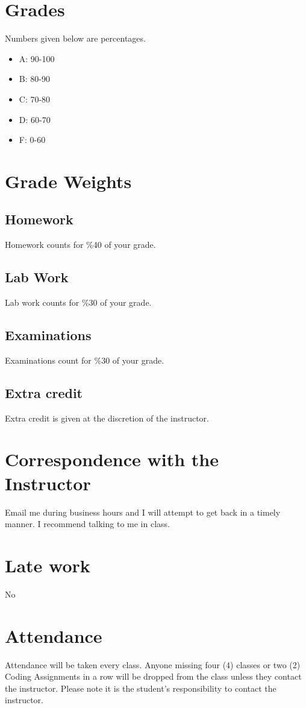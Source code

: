 \documentclass[12pt]{article}
\begin{document}
	\section*{Grades}
		Numbers given below are percentages.
		\begin{itemize}
			\item A: 90-100
			\item B: 80-90
			\item C: 70-80
			\item D: 60-70
			\item F: 0-60
		\end{itemize}
	
	\section*{Grade Weights}
	\subsection{Homework}
		Homework counts for \%40 of your grade.
	\subsection{Lab Work}
		Lab work counts for \%30 of your grade.
	\subsection{Examinations}
		Examinations count for \%30 of your grade.
	\subsection{Extra credit}
		Extra credit is given at the discretion of the instructor.
	
	\section*{Correspondence with the Instructor}
		Email me during business hours and I will attempt to get back in a timely manner.
		I recommend talking to me in class.
	
	\section*{Late work}
		No
	
	\section*{Attendance}
		Attendance will be taken every class. Anyone missing four (4) classes or two (2) Coding Assignments in a row will be dropped from the class unless they contact the instructor. Please note it is the student’s responsibility to contact the instructor.
	
\end{document}
